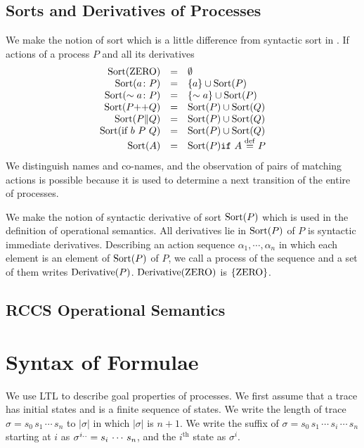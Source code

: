 \documentclass[12pt,a4paper,titlepage]{article}
\theoremstyle{break}
\begin{document}
\subsection{Sorts and Derivatives of Processes}
We make the notion of sort which is a little difference from syntactic sort in \cite{mil:book}.
If actions of a process \(P\) and all its derivatives
  \begin{displaymath}
    \begin{array}{rcl}
\sort{\ZERO}&=&\emptyset\\
\sort{a\colon P}&=&\{a\}\cup\sort{P}\\
\sort{\sim a\colon P}&=&\{\sim a\}\cup\sort{P}\\
\sort{P\mbox{++}Q}&=&\sort{P}\cup\sort{Q}\\
\sort{P\|Q}&=&\sort{P}\cup\sort{Q}\\
\sort{\mbox{if}\ b\ P\ Q}&=&\sort{P}\cup\sort{Q}\\
\sort{A}&=&\sort{P} \mbox{{\tt if} $A\procdef P$}
    \end{array}
  \end{displaymath}
We distinguish names and co-names, and the observation of pairs of matching actions is possible because it is used to determine a next transition of the entire of processes.

We make the notion of syntactic derivative of sort \(\sort{P}\) which is used in the definition of operational semantics.
All derivatives lie in \(\sort{P}\) of \(P\) is syntactic immediate derivatives.
Describing an action sequence \(\alpha_1,\cdots,\alpha_n\) in which each element is an element of \(\sort{P}\) of \(P\), we call a process of the sequence
 and a set of them writes \(\derivative{P}\).
\(\derivative{\ZERO}\) is \(\{\ZERO\}\).
%
%
\subsection{RCCS Operational Semantics}\label{sec:OPERATINAL_SEMANTICS}

\section{Syntax of Formulae}
We use LTL to describe goal properties of processes.
We first assume that a trace has initial states and is a finite sequence of states.
We write the length of trace \(\sigma=s_0\,s_1\,\cdots\,s_n\) to \(|\sigma|\) in which \(|\sigma|\) is \(n+1\).
We write the suffix of \(\sigma=s_0\,s_1\,\cdots\,s_i\,\cdots\,s_n\) starting at \(i\) as \(\suffix{\sigma}{i}=s_i\,\cdots\,s_n\), and the \(i^{\mbox{th}}\) state as \(\sigma^i\).
\end{document}
